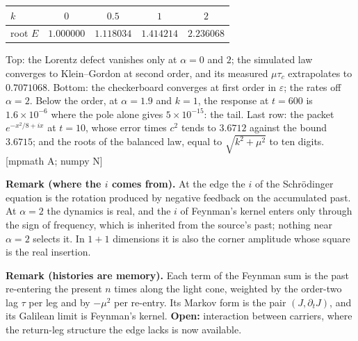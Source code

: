 \documentclass[10pt]{article}
\newcommand{\eps}{\varepsilon}
\newcommand{\tg}[1]{{\scriptsize[#1]}}
\begin{document}
\begin{smallbox}
{\begin{tabular}[t]{@{}l c c c c@{}}
\toprule
$k$ & $0$ & $0.5$ & $1$ & $2$\\
\midrule
root $E$ & $1.000000$ & $1.118034$ & $1.414214$ & $2.236068$\\
\bottomrule
\end{tabular}}\par\vspace{2pt}
Top: the Lorentz defect vanishes only at $\alpha=0$ and $2$; the simulated law converges to Klein--Gordon at second order, and its measured $\mu\tau_c$ extrapolates to $0.7071068$. Bottom: the checkerboard converges at first order in $\eps$; the rates off $\alpha=2$. Below the order, at $\alpha=1.9$ and $k=1$, the response at $t=600$ is $1.6\times10^{-6}$ where the pole alone gives $5\times10^{-15}$: the tail. Last row: the packet $e^{-x^2/8+ix}$ at $t=10$, whose error times $c^2$ tends to $3.6712$ against the bound $3.6715$; and the roots of the balanced law, equal to $\sqrt{k^2+\mu^2}$ to ten digits. \tg{mpmath A; numpy N}
\end{smallbox}

\vspace{1pt}
\begin{smallbox}
\textbf{Remark (where the $i$ comes from).} At the edge the $i$ of the Schr\"odinger equation is the rotation produced by negative feedback on the accumulated past. At $\alpha=2$ the dynamics is real, and the $i$ of Feynman's kernel enters only through the sign of frequency, which is inherited from the source's past; nothing near $\alpha=2$ selects it. In $1+1$ dimensions it is also the corner amplitude whose square is the real insertion.\par\vspace{1pt}
\textbf{Remark (histories are memory).} Each term of the Feynman sum is the past re-entering the present $n$ times along the light cone, weighted by the order-two lag $\tau$ per leg and by $-\mu^2$ per re-entry. Its Markov form is the pair $(J,\partial_tJ)$, and its Galilean limit is Feynman's kernel. \textbf{Open:} interaction between carriers, where the return-leg structure the edge lacks is now available.
\end{smallbox}
\end{document}
